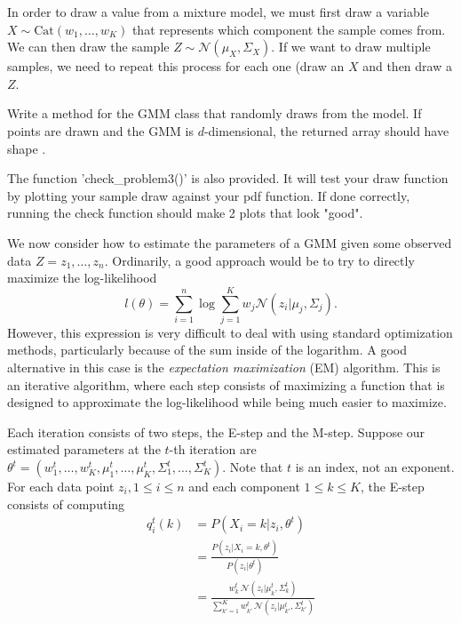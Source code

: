 In order to draw a value from a mixture model, we must first draw a variable \(X \sim \mathrm{Cat}(w_1,\ldots, w_K)\) that represents which component the sample comes from.
We can then draw the sample \(Z\sim \mathcal{N}(\mu_X, \Sigma_X)\).
If we want to draw multiple samples, we need to repeat this process for each one (draw an \(X\) and then draw a \(Z\).

\begin{problem}
Write a method  for the GMM class that randomly draws from the model.
If  points are drawn and the GMM is \(d\)-dimensional, the returned array should have shape .

The function 'check\_problem3()' is also provided. It will test your draw function by plotting your sample draw against your pdf function. If done correctly, running the check function should make 2 plots that look "good".
\end{problem}

We now consider how to estimate the parameters of a GMM given some observed data \(Z = z_1,\ldots, z_n\).
Ordinarily, a good approach would be to try to directly maximize the log-likelihood
\[
l(\theta)=\sum_{i=1}^n\log\sum_{j=1}^Kw_{j} \mathcal{N}(z_i | \mu_{j}, \Sigma_{j}).
\]
However, this expression is very difficult to deal with using standard optimization methods, particularly because of the sum inside of the logarithm.
A good alternative in this case is the \emph{expectation maximization} (EM) algorithm.
This is an iterative algorithm, where each step consists of maximizing a function that is designed to approximate the log-likelihood while being much easier to maximize.

Each iteration consists of two steps, the E-step and the M-step.
Suppose our estimated parameters at the \(t\)-th iteration are \(\theta^t=\left(w_1^t,\ldots,w_K^t, \mu_1^t,\ldots,\mu_K^t,\Sigma_1^t,\ldots,\Sigma_K^t\right)\).
Note that \(t\) is an index, not an exponent.
For each data point \(z_i, 1\leq i \leq n\) and each component \(1\leq k\leq K\), the E-step consists of computing
\begin{align*}
q_i^t(k) &=
P(X_i=k | z_i, \theta^t)
\\
&=
\frac{P(z_i|X_i=k,\theta^t)}{P(z_i|\theta^t)}
\\
&=
\frac{
w_k^t \,\mathcal{N}(z_i| \mu_k^t,\Sigma_k^t)
}{
\sum_{k'=1}^K
w_{k'}^t \,\mathcal{N}(z_i| \mu_{k'}^t,\Sigma_{k'}^t)
}
\end{align*}

